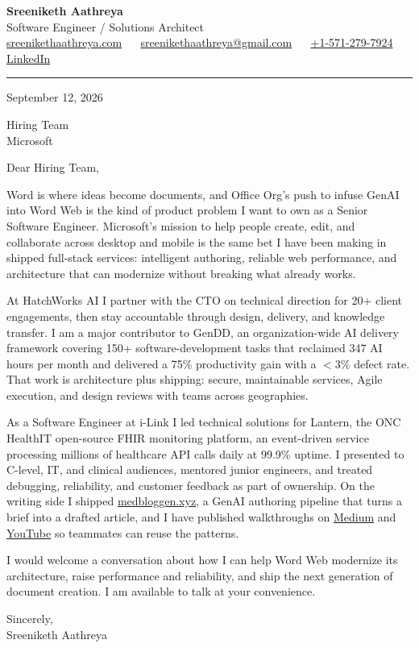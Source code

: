 \documentclass[11pt, letterpaper]{article}
\begin{document}
{\fontsize{18 pt}{20 pt}\selectfont\bfseries Sreeniketh Aathreya}\\[4pt]
Software Engineer / Solutions Architect\\[6pt]
\href{https://sreenikethaathreya.com}{sreenikethaathreya.com}
~\textbullet~
\href{mailto:sreenikethaathreya@gmail.com}{sreenikethaathreya@gmail.com}
~\textbullet~
\href{tel:+1-571-279-7924}{+1-571-279-7924}
~\textbullet~
\href{https://www.linkedin.com/in/sreeniketh-aathreya-16800b122/}{LinkedIn}

\vspace{12pt}
\hrule
\vspace{12pt}

September 12, 2026

\vspace{8pt}

Hiring Team\\
Microsoft

\vspace{12pt}

Dear Hiring Team,

Word is where ideas become documents, and Office Org's push to infuse GenAI into Word Web is the kind of product problem I want to own as a Senior Software Engineer. Microsoft's mission to help people create, edit, and collaborate across desktop and mobile is the same bet I have been making in shipped full-stack services: intelligent authoring, reliable web performance, and architecture that can modernize without breaking what already works.

At HatchWorks AI I partner with the CTO on technical direction for 20+ client engagements, then stay accountable through design, delivery, and knowledge transfer. I am a major contributor to GenDD, an organization-wide AI delivery framework covering 150+ software-development tasks that reclaimed 347 AI hours per month and delivered a 75\% productivity gain with a $<$3\% defect rate. That work is architecture plus shipping: secure, maintainable services, Agile execution, and design reviews with teams across geographies.

As a Software Engineer at i-Link I led technical solutions for Lantern, the ONC HealthIT open-source FHIR monitoring platform, an event-driven service processing millions of healthcare API calls daily at 99.9\% uptime. I presented to C-level, IT, and clinical audiences, mentored junior engineers, and treated debugging, reliability, and customer feedback as part of ownership. On the writing side I shipped \href{https://medbloggen.xyz}{medbloggen.xyz}, a GenAI authoring pipeline that turns a brief into a drafted article, and I have published walkthroughs on \href{https://medium.com/@sreenikethaathreya}{Medium} and \href{https://www.youtube.com/@sreenikethaathreya7555}{YouTube} so teammates can reuse the patterns.

I would welcome a conversation about how I can help Word Web modernize its architecture, raise performance and reliability, and ship the next generation of document creation. I am available to talk at your convenience.

Sincerely,\\[12pt]
Sreeniketh Aathreya
\end{document}

